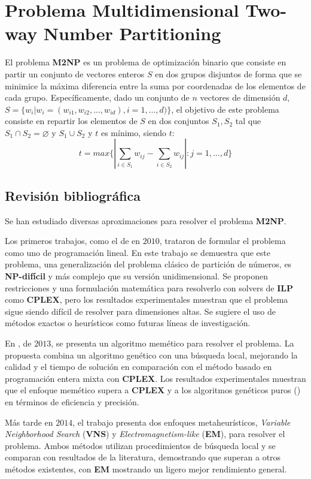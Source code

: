 \documentclass[12pt,letterpaper]{article}
\begin{document}
\section{Problema Multidimensional Two-way Number Partitioning}
El problema \textbf{M2NP} es un problema de optimización binario que consiste en partir un conjunto de vectores enteros $S$ en dos grupos disjuntos de forma que se minimice la máxima diferencia entre la suma por coordenadas de los elementos de cada grupo. Específicamente, dado un conjunto de $n$ vectores de dimensión $d$, $S=\{w_i|w_i=(w_{i1}, w_{i2},...,w_{id}), i=1,...,d)\}$, el objetivo de este problema consiste en repartir los elementos de $S$ en dos conjuntos $S_1, S_2$ tal que $S_1\cap S_2=\varnothing$ y $S_1\cup S_2$ y $t$ es mínimo, siendo $t$:
\begin{equation}
    t= max\{|\sum_{i\in S_1}w_{ij}-\sum_{i\in S_2}w_{ij}|:j=1,...,d\}
\end{equation}

\subsection{Revisión bibliográfica}
Se han estudiado diversas aproximaciones para resolver el problema \textbf{M2NP}. 

Los primeros trabajos, como el de \cite{KOJIC20102302} en $2010$, trataron de formular el problema como uno de programación lineal. En este trabajo se demuestra que este problema, una generalización del problema clásico de partición de números, es \textbf{NP-difícil} y más complejo que su versión unidimensional. Se proponen restricciones y una formulación matemática para resolverlo con solvers de \textbf{ILP} como \textbf{CPLEX}, pero los resultados experimentales muestran que el problema sigue siendo difícil de resolver para dimensiones altas. Se sugiere el uso de métodos exactos o heurísticos como futuras líneas de investigación.

En \cite{POP20139191}, de $2013$, se presenta un algoritmo memético para resolver el problema. La propuesta combina un algoritmo genético con una búsqueda local, mejorando la calidad y el tiempo de solución en comparación con el método basado en programación entera mixta con \textbf{CPLEX}. Los resultados experimentales muestran que el enfoque memético supera a \textbf{CPLEX} y a los algoritmos genéticos puros (\cite{10.1007/978-3-642-44973-4_10}) en términos de eficiencia y precisión.

Más tarde en $2014$, el trabajo \cite{KRATICA201459} presenta dos enfoques metaheurísticos, \textit{Variable Neighborhood Search} (\textbf{VNS}) y \textit{Electromagnetism-like} (\textbf{EM}), para resolver el problema. Ambos métodos utilizan procedimientos de búsqueda local y se comparan con resultados de la literatura, demostrando que superan a otros métodos existentes, con \textbf{EM} mostrando un ligero mejor rendimiento general.
\end{document}
